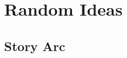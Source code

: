 \chapter{\TheKenosis}
























\chapter{\RamielsAwakeningBook}
















\chapter{\ThirdBanewarBook}
























\chapter{Random Ideas}












\section{\Shilred{} Story Arc}





